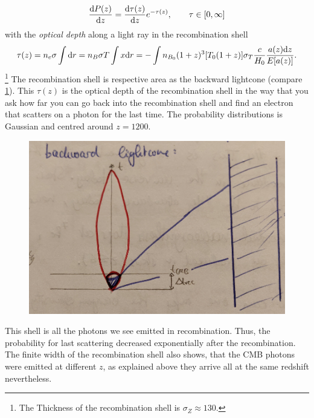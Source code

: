 \begin{equation}
	\frac{\mathrm{d} P(z)}{\mathrm{d} z} = \frac{\mathrm{d} \tau(z)}{\mathrm{d} z} e^{-\tau(z)},\qquad \tau \in[0,\infty] 
\end{equation}
with the \emph{optical depth} along a light ray in the recombination shell
\begin{equation}
	\tau(z) = n_e \sigma \int \mathrm{d} r = n_B \sigma T \int x \mathrm{d} r= - \int n_{B_0} (1+z)^3 [T_0 (1+z)] \sigma_T \frac{c}{H_0} \frac{a(z) \mathrm{d} z}{E[a(z)]}.
\end{equation}\footnote{The Thickness of the recombination shell is $\sigma_Z \approx 130$.}
The recombination shell is respective area as the backward lightcone (compare \ref{fig:recombinationshell}).
This $ \tau(z)$ is the optical depth of the recombination shell in the way that you ask how far you can go back into the recombination shell and find an electron that scatters on a photon for the last time. The probability distributions is Gaussian and centred around $z=1200$.
\begin{figure}[h!]
	\centering
	\includegraphics[width=0.5\linewidth]{gfx/recombinationShell}
	\caption{}
	\label{fig:recombinationshell}
\end{figure}
This shell is all the photons we see emitted in recombination. Thus, the probability for last scattering decreased exponentially after the recombination. The finite width of the recombination shell also shows, that the CMB photons were emitted at different $z$, as explained above they arrive all at the same redshift nevertheless.

